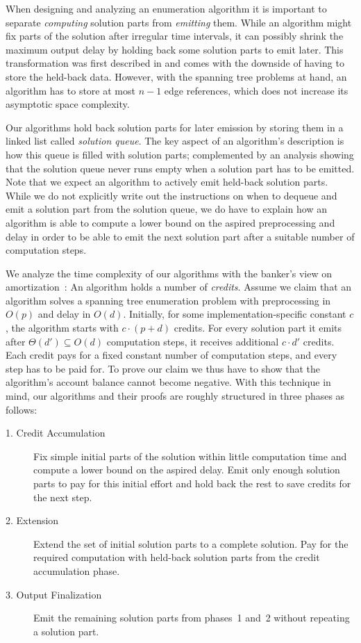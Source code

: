 \documentclass[a4paper, USenglish, cleveref, autoref, thm-restate]{lipics-v2021}
\begin{document}
When designing and analyzing an enumeration algorithm it is important to separate \emph{computing} solution parts from \emph{emitting} them.
While an algorithm might fix parts of the solution after irregular time intervals, it can possibly shrink the maximum output delay by holding back some solution parts to emit later.
This transformation was first described in \cite{goldbergEfficientAlgorithmsListing1991} and comes with the downside of having to store the held-back data.
However, with the spanning tree problems at hand, an algorithm has to store at most $n-1$ edge references, which does not increase its asymptotic space complexity.

Our algorithms hold back solution parts for later emission by storing them in a linked list called \textit{solution queue}.
The key aspect of an algorithm's description is how this queue is filled with solution parts; complemented by an analysis showing that the solution queue never runs empty when a solution part has to be emitted.
Note that we expect an algorithm to actively emit held-back solution parts.
While we do not explicitly write out the instructions on when to dequeue and emit a solution part from the solution queue, we do have to explain how an algorithm is able to compute a lower bound on the aspired preprocessing and delay in order to be able to emit the next solution part after a suitable number of computation steps.

We analyze the time complexity of our algorithms with the banker's view on amortization~\cite{tarjanAmortizedComputationalComplexity1985}:
An algorithm holds a number of \textit{credits}.
Assume we claim that an algorithm solves a spanning tree enumeration problem with preprocessing in $O(p)$ and delay in $O(d)$.
Initially, for some implementation-specific constant $c$, the algorithm starts with $c \cdot (p+d)$ credits.
For every solution part it emits after $\Theta(d') \subseteq O(d)$ computation steps, it receives additional $c \cdot d'$ credits.
Each credit pays for a fixed constant number of computation steps, and every step has to be paid for.
To prove our claim we thus have to show that the algorithm's account balance cannot become negative.
With this technique in mind, our algorithms and their proofs are roughly structured in three phases as follows:
\begin{description}
	\item[1. Credit Accumulation] Fix simple initial parts of the solution within little computation time and compute a lower bound on the aspired delay. Emit only enough solution parts to pay for this initial effort and hold back the rest to save credits for the next step.
	\item[2. Extension] Extend the set of initial solution parts to a complete solution.
		Pay for the required computation with held-back solution parts from the credit accumulation phase.
	\item[3. Output Finalization] Emit the remaining solution parts from phases~1 and~2 without repeating a solution part.
\end{description}
\end{document}
